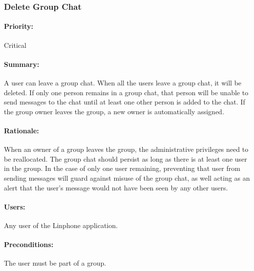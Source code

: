 \documentclass[11pt]{article}
\begin{document}
\subsubsection{Delete Group Chat} \label{UC-delete-group}
\paragraph{Priority:}Critical
\paragraph{Summary:}A user can leave a group chat. When all the users leave a group chat, it will be deleted. If only one person remains in a group chat, that person will be unable to send messages to the chat until at least one other person is added to the chat. If the group owner leaves the group, a new owner is automatically assigned.
\paragraph{Rationale:}When an owner of a group leaves the group, the administrative privileges need to be reallocated. The group chat should persist as long as there is at least one user in the group. In the case of only one user remaining, preventing that user from sending messages will guard against misuse of the group chat, as well acting as an alert that the user's message would not have been seen by any other users.
\paragraph{Users:} Any user of the Linphone application.
\paragraph{Preconditions:} The user must be part of a group.
\end{document}
